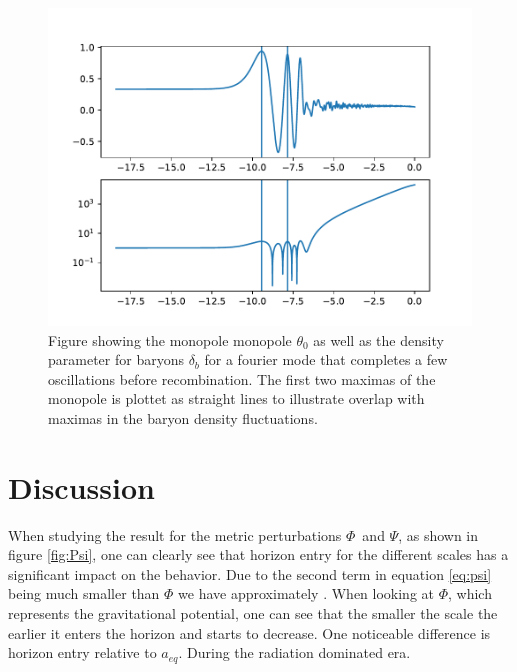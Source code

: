 \documentclass[onecolumn]{aastex62}
\begin{document}
\begin{figure}
    \includegraphics[scale=0.8]{figures/comparison0.pdf}
    \caption{Figure showing the monopole monopole $\theta_0$ as well as the density parameter for baryons $\delta_b$ for a fourier mode that completes a few oscillations before recombination. The first two maximas of the monopole is plottet as straight lines to illustrate overlap with maximas in the baryon density fluctuations.}
    \label{fig:comp0}
\end{figure}
\section{Discussion}\label{sec:discussion}
When studying the result for the metric perturbations $\Phi$ and $\Psi$, as shown in figure \ref{fig:Psi}, one can clearly see that horizon entry for the different scales has a significant impact on the behavior. Due to the second term in equation \ref{eq:psi} being much smaller than $\Phi$ we have approximately . When looking at $\Phi$, which represents the gravitational potential, one can see that the smaller the scale the earlier it enters the horizon and starts to decrease. One noticeable difference is horizon entry relative to $a_{eq}$. During the radiation dominated era.
\end{document}
